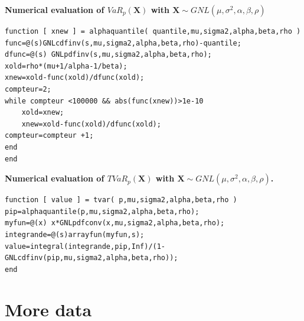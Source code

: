 \documentclass[12pt,travaildirige,nobabel, twoside]{dms}
\numberwithin{equation}{section}
\numberwithin{table}{chapter}
\numberwithin{figure}{chapter}
\begin{document}
\noindent
\textbf{Numerical evaluation of $VaR_p(\textbf{X})$ with $\textbf{X}\sim GNL(\mu,\sigma^2,\alpha,\beta,\rho)$}
\begin{lstlisting}
function [ xnew ] = alphaquantile( quantile,mu,sigma2,alpha,beta,rho )
func=@(s)GNLcdfinv(s,mu,sigma2,alpha,beta,rho)-quantile;
dfunc=@(s) GNLpdfinv(s,mu,sigma2,alpha,beta,rho);
xold=rho*(mu+1/alpha-1/beta);
xnew=xold-func(xold)/dfunc(xold);
compteur=2;
while compteur <100000 && abs(func(xnew))>1e-10   
    xold=xnew;
    xnew=xold-func(xold)/dfunc(xold);    
compteur=compteur +1;
end
end
\end{lstlisting}

\noindent
\textbf{Numerical evaluation of $TVaR_p(\textbf{X})$ with $\textbf{X}\sim GNL(\mu,\sigma^2,\alpha,\beta,\rho)$.}
\begin{lstlisting}
function [ value ] = tvar( p,mu,sigma2,alpha,beta,rho )
pip=alphaquantile(p,mu,sigma2,alpha,beta,rho);
myfun=@(x) x*GNLpdfconv(x,mu,sigma2,alpha,beta,rho);
integrande=@(s)arrayfun(myfun,s);
value=integral(integrande,pip,Inf)/(1-GNLcdfinv(pip,mu,sigma2,alpha,beta,rho));
end
\end{lstlisting}

\newpage
\section{More data}
\end{document}
